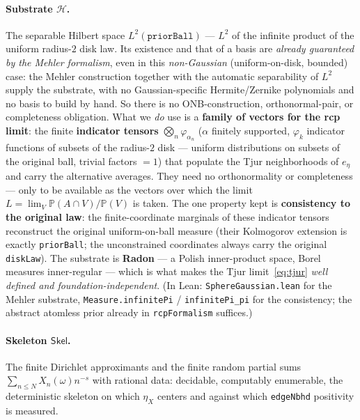 \documentclass[11pt,a4paper]{article}
\theoremstyle{definition}
\newcommand{\etaX}{\eta_X}
\begin{document}
\paragraph{Substrate \(\mathcal{H}\).} The separable Hilbert space
\(L^2(\texttt{priorBall})\) --- \(L^2\) of the infinite product of the uniform radius-\(2\)
disk law. Its existence and that of a basis are \emph{already guaranteed by the Mehler
formalism}, even in this \emph{non-Gaussian} (uniform-on-disk, bounded) case: the Mehler
construction together with the automatic separability of \(L^2\) supply the substrate, with
no Gaussian-specific Hermite/Zernike polynomials and no basis to build by hand. So there is
no ONB-construction, orthonormal-pair, or completeness obligation. What we \emph{do} use is a
\textbf{family of vectors for the rcp limit}: the finite \textbf{indicator tensors}
\(\bigotimes_n \varphi_{\alpha_n}\) (\(\alpha\) finitely supported, \(\varphi_k\) indicator
functions of subsets of the radius-\(2\) disk --- uniform distributions on subsets of the
original ball, trivial factors \(=1\)) that populate the Tjur neighborhoods of \(e_\eta\) and
carry the alternative averages. They need no orthonormality or completeness --- only to be
available as the vectors over which the limit \(L=\lim_V\mathbb{P}(A\cap V)/\mathbb{P}(V)\) is
taken. The one property kept is \textbf{consistency to the original law}: the
finite-coordinate marginals of these indicator tensors reconstruct the original
uniform-on-ball measure (their Kolmogorov extension is exactly \texttt{priorBall}; the
unconstrained coordinates always carry the original \texttt{diskLaw}). The substrate is
\textbf{Radon} --- a Polish inner-product space, Borel measures inner-regular --- which is
what makes the Tjur limit~\eqref{eq:tjur} \emph{well defined and foundation-independent}.
(In Lean: \texttt{SphereGaussian.lean} for the Mehler substrate, \texttt{Measure.infinitePi}
/ \texttt{infinitePi\_pi} for the consistency; the abstract atomless prior already in
\texttt{rcpFormalism} suffices.)

\paragraph{Skeleton \(\mathsf{Skel}\).} The finite Dirichlet approximants and the finite
random partial sums \(\sum_{n\le N}X_n(\omega)n^{-s}\) with rational data: decidable,
computably enumerable, the deterministic skeleton on which \(\etaX\) centers and against
which \texttt{edgeNbhd} positivity is measured.
\end{document}

